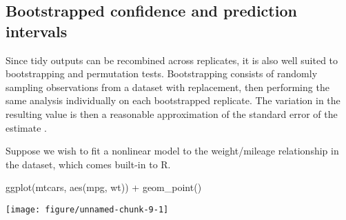 % 
% 
% 
% 

\subsection{Bootstrapped confidence and prediction intervals}

\label{sec:bootstrapping}

Since tidy outputs can be recombined across replicates, it is also well suited to bootstrapping and permutation tests. Bootstrapping consists of randomly sampling observations from a dataset with replacement, then performing the same analysis individually on each bootstrapped replicate. The variation in the resulting value is then a reasonable approximation of the standard error of the estimate \citep{efron1994introduction}.

Suppose we wish to fit a nonlinear model to the weight/mileage relationship in the  dataset, which comes built-in to R.

\begin{center}

\begin{example}
ggplot(mtcars, aes(mpg, wt)) + geom_point()
\end{example}

\texttt{[image: figure/unnamed-chunk-9-1]} 
\end{center}

